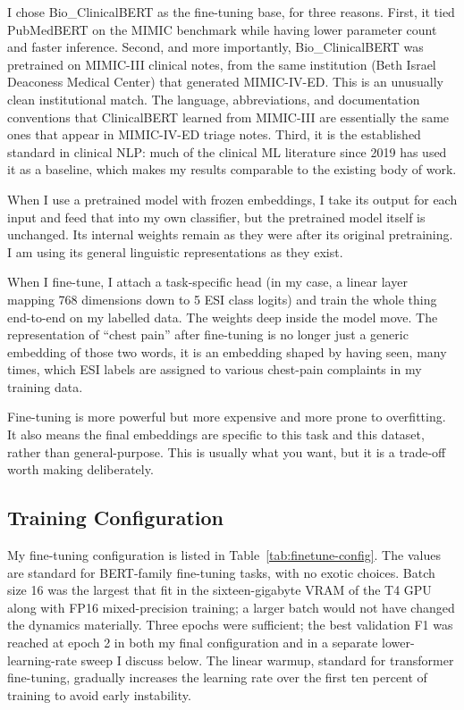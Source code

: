 I chose Bio\_ClinicalBERT as the fine-tuning base, for three reasons. First, it tied PubMedBERT on the MIMIC benchmark while having lower parameter count and faster inference. Second, and more importantly, Bio\_ClinicalBERT was pretrained on MIMIC-III clinical notes, from the same institution (Beth Israel Deaconess Medical Center) that generated MIMIC-IV-ED. This is an unusually clean institutional match. The language, abbreviations, and documentation conventions that ClinicalBERT learned from MIMIC-III are essentially the same ones that appear in MIMIC-IV-ED triage notes. Third, it is the established standard in clinical NLP: much of the clinical ML literature since 2019 has used it as a baseline, which makes my results comparable to the existing body of work.

\begin{notebox}
When I use a pretrained model with frozen embeddings, I take its output for each input and feed that into my own classifier, but the pretrained model itself is unchanged. Its internal weights remain as they were after its original pretraining. I am using its general linguistic representations as they exist.

When I fine-tune, I attach a task-specific head (in my case, a linear layer mapping 768 dimensions down to 5 ESI class logits) and train the whole thing end-to-end on my labelled data. The weights deep inside the model move. The representation of ``chest pain'' after fine-tuning is no longer just a generic embedding of those two words, it is an embedding shaped by having seen, many times, which ESI labels are assigned to various chest-pain complaints in my training data.

Fine-tuning is more powerful but more expensive and more prone to overfitting. It also means the final embeddings are specific to this task and this dataset, rather than general-purpose. This is usually what you want, but it is a trade-off worth making deliberately.
\end{notebox}

\subsection*{Training Configuration}

My fine-tuning configuration is listed in Table~\ref{tab:finetune-config}. The values are standard for BERT-family fine-tuning tasks, with no exotic choices. Batch size 16 was the largest that fit in the sixteen-gigabyte VRAM of the T4 GPU along with FP16 mixed-precision training; a larger batch would not have changed the dynamics materially. Three epochs were sufficient; the best validation F1 was reached at epoch 2 in both my final configuration and in a separate lower-learning-rate sweep I discuss below. The linear warmup, standard for transformer fine-tuning, gradually increases the learning rate over the first ten percent of training to avoid early instability.

